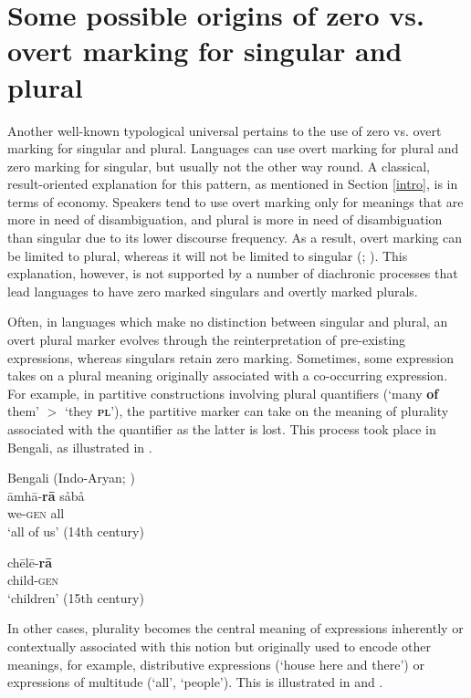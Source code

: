 \documentclass[output=paper]{langsci/langscibook}
\begin{document}
\section{Some possible origins of zero vs. overt marking for singular
  and plural}\label{number}
Another well-known typological
universal pertains to the use of zero vs. overt
marking for singular and plural. Languages can use overt marking for plural and zero marking for
  singular, but usually not the other way round. A classical,
  result-oriented explanation for this pattern, as
  mentioned in Section \ref{intro},  is in terms of economy. Speakers tend to use overt marking
  only for meanings that are more in need of disambiguation, and plural is more in need of disambiguation than singular due to its
  lower discourse frequency. As a result, overt marking can be limited
  to plural, whereas it will not be limited to singular (\citealt{Greenberg1966,TU2};
  \citealt{Haspelmath2008}).  This explanation, however, is not
supported by a number of diachronic processes that lead languages to
have zero marked singulars and overtly marked plurals.


Often, in languages which make no distinction between singular
and plural, an overt plural marker evolves through the reinterpretation of
pre-existing expressions, whereas
    singulars retain zero marking. Sometimes, some expression takes on a plural meaning originally associated with
      a co-occurring expression. For example, in partitive
      constructions involving plural quantifiers (`many
      {\bf of} them' $>$ `they  {\bf \textsc{pl}}'), the partitive marker can take on the meaning of
      plurality associated with the quantifier as the latter is
      lost. This process took place in  Bengali, as illustrated in .

\newpage

\ea\label{bengali}
Bengali (Indo-Aryan; )\\
\ea
\gll āmhā-\textbf{{rā}} s{\r{a}}b{\r{a}}\\
we-\textsc{gen} all\\
\glt `all of us' (14th century)


\ex
\gll chēlē-\textbf{{rā}} \\
child-\textsc{gen}\\
\glt `children' (15th century)

\z
\z


In other cases, plurality becomes the central meaning of expressions
inherently or contextually
associated with this notion but originally used to encode other meanings, for example, distributive expressions
(`house here and there') or expressions of multitude (`all', `people'). This is illustrated in  and .
\end{document}
